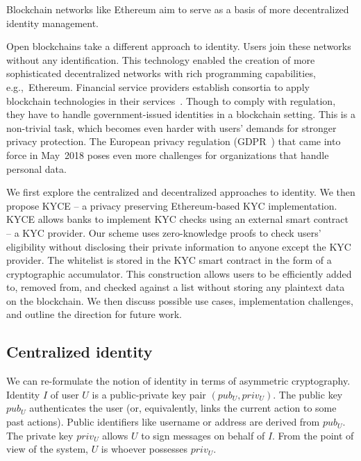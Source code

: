 Blockchain networks like Ethereum aim to serve as a basis of more decentralized identity management.

Open blockchains take a different approach to identity.
Users join these networks without any identification.
This technology enabled the creation of more sophisticated decentralized networks with rich programming capabilities, e.g.,~Ethereum.
Financial service providers establish consortia to apply blockchain technologies in their services~\cite{EEA2017, Hyperledger, R3}.
Though to comply with regulation, they have to handle government-issued identities in a blockchain setting.
This is a non-trivial task, which becomes even harder with users' demands for stronger privacy protection.
The European privacy regulation (GDPR~\cite{GDPR16}) that came into force in May~2018 poses even more challenges for organizations that handle personal data.

We first explore the centralized and decentralized approaches to identity.
We then propose KYCE -- a privacy preserving Ethereum-based KYC implementation.
KYCE allows banks to implement KYC checks using an external smart contract -- a KYC provider.
Our scheme uses zero-knowledge proofs to check users' eligibility without disclosing their private information to anyone except the KYC provider.
The whitelist is stored in the KYC smart contract in the form of a cryptographic accumulator.
This construction allows users to be efficiently added to, removed from, and checked against a list without storing any plaintext data on the blockchain.
We then discuss possible use cases, implementation challenges, and outline the direction for future work.

\subsection{Centralized identity}

We can re-formulate the notion of identity in terms of asymmetric cryptography.
Identity $I$ of user $U$ is a public-private key pair $(pub_U, priv_U)$.
The public key $pub_U$ authenticates the user (or, equivalently, links the current action to some past actions).
Public identifiers like username or address are derived from $pub_U$.
The private key $priv_U$ allows $U$ to sign messages on behalf of $I$.
From the point of view of the system, $U$ is whoever possesses $priv_U$.

